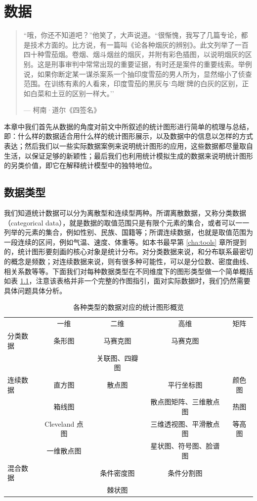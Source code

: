 \documentclass[
  b5paper,
  UTF8,twoside]{book}
\begin{document}
\chapter{数据}\label{chap:data}

\begin{quote}
``哦，你还不知道吧？''他笑了，大声说道。``很惭愧，我写了几篇专论，都是技术方面的。比方说，有一篇叫《论各种烟灰的辨别》。此文列举了一百四十种雪茄烟。卷烟、烟斗烟丝的烟灰，并附有彩色插图，以说明烟灰的区别。这是刑事审判中常常出现的重要证据，有时还是案件的重要线索。举例说，如果你断定某一谋杀案系一个抽印度雪茄的男人所为，显然缩小了侦查范围。在训练有素的人看来，印度雪茄的黑灰与`鸟眼'牌的白灰的区别，正如白菜和土豆的区别一样大。''

\hspace*{\fill} --- 柯南·道尔《四签名》
\end{quote}

本章中我们首先从数据的角度对前文中所叙述的统计图形进行简单的梳理与总结，即：什么样的数据适合用什么样的统计图形展示，以及数据中的信息以怎样的方式表达；然后我们以一些实际数据案例来说明统计图形的应用，这些数据都尽量取自生活，以保证足够的新颖性；最后我们也利用统计模拟生成的数据来说明统计图形的另类价值，即它在解释统计模型中的独特地位。

\section{数据类型}\label{sec:data-type}

我们知道统计数据可以分为离散型和连续型两种。所谓离散数据，又称分类数据（categorical data），就是数据的取值范围只是有限个元素的集合，或者可以一一列举的元素的集合，例如性别、民族、国籍等；所谓连续数据，也就是取值范围为一段连续的区间，例如气温、速度、体重等。如本书最早第 \ref{cha:tools} 章所提到的，统计图形要刻画的核心对象是统计分布。对分类数据来说，和分布联系最密切的概念是频数；对连续数据来说，则有很多种可能性，可以是分位数、密度曲线、相关系数等等。下面我们对每种数据类型在不同维度下的图形类型做一个简单概括如表 \ref{tab:plot-summary}，注意该表格并非一个完整的作图指引，面对实际数据时，我们仍然需要具体问题具体分析。

\begin{longtable}[]{@{}lcccc@{}}
\caption{\label{tab:plot-summary} 各种类型的数据对应的统计图形概览}\tabularnewline
\toprule\noalign{}
\endfirsthead
\endhead
\bottomrule\noalign{}
\endlastfoot
& 一维 & 二维 & 高维 & 矩阵 \\
分类数据 & 条形图 & 马赛克图 & 马赛克图 & \\
& & 关联图、四瓣图 & & \\
连续数据 & 直方图 & 散点图 & 平行坐标图 & 颜色图 \\
& 箱线图 & & 散点图矩阵、三维散点图 & 热图 \\
& Cleveland 点图 & & 三维透视图、平滑散点图 & 等高图 \\
& 一维散点图 & & 星状图、符号图、脸谱图 & \\
混合数据 & & 条件密度图 & 条件分割图 & \\
& & 棘状图 & & \\
\end{longtable}
\end{document}
